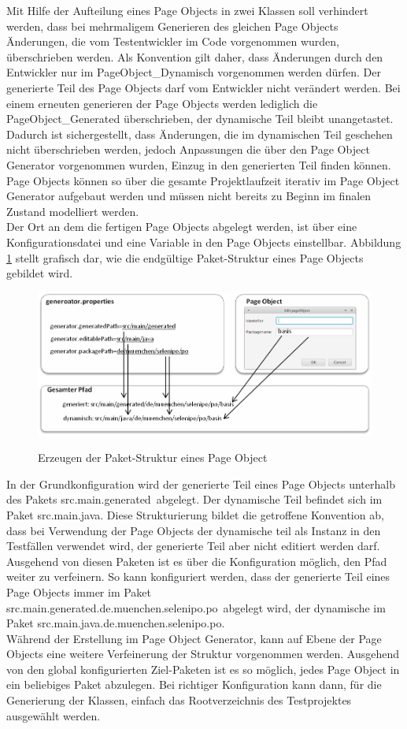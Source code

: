 Mit Hilfe der Aufteilung eines Page Objects in zwei Klassen soll verhindert werden, dass bei mehrmaligem Generieren des gleichen Page Objects Änderungen, die vom Testentwickler im Code vorgenommen wurden, überschrieben werden. Als Konvention gilt daher, dass Änderungen durch den Entwickler nur im PageObject\_Dynamisch vorgenommen werden dürfen. Der generierte Teil des Page Objects darf vom Entwickler nicht verändert werden.
Bei einem erneuten generieren der Page Objects werden lediglich die PageObject\_Generated überschrieben, der dynamische Teil bleibt unangetastet.
Dadurch ist sichergestellt, dass Änderungen, die im dynamischen Teil geschehen nicht überschrieben werden, jedoch Anpassungen die über den Page Object Generator vorgenommen wurden, Einzug in den generierten Teil finden können.
Page Objects können so über die gesamte Projektlaufzeit iterativ im Page Object Generator aufgebaut werden und müssen nicht bereits zu Beginn im finalen Zustand modelliert werden.\\
Der Ort an dem die fertigen Page Objects abgelegt werden, ist über eine Konfigurationsdatei und eine Variable in den Page Objects einstellbar. 
Abbildung \ref{fig:packagepath} stellt grafisch dar, wie die endgültige Paket-Struktur eines Page Objects gebildet wird.
\begin{figure}[htb]
  \centering  
  \includegraphics[scale=0.8]{img/packagePath.png}\\
  \caption{Erzeugen der Paket-Struktur eines Page Object}
  \label{fig:packagepath}
\end{figure}
In der Grundkonfiguration wird der generierte Teil eines Page Objects unterhalb des Pakets \grq src.main.generated\grq\ abgelegt. Der dynamische Teil befindet sich im Paket \grq src.main.java\grq.
Diese Strukturierung bildet die getroffene Konvention ab, dass bei Verwendung der Page Objects der dynamische teil als Instanz in den Testfällen verwendet wird, der generierte Teil aber nicht editiert werden darf.
Ausgehend von diesen Paketen ist es über die Konfiguration möglich, den Pfad weiter zu verfeinern. So kann konfiguriert werden, dass der generierte Teil eines Page Objects immer im Paket \grq src.main.generated.de.muenchen.selenipo.po\grq\ abgelegt wird, der dynamische im Paket \grq src.main.java.de.muenchen.selenipo.po\grq.\\
Während der Erstellung im Page Object Generator, kann auf Ebene der Page Objects eine weitere Verfeinerung der Struktur vorgenommen werden. Ausgehend von den global konfigurierten Ziel-Paketen ist es so möglich, jedes Page Object in ein beliebiges Paket abzulegen.
Bei richtiger Konfiguration kann dann, für die Generierung der Klassen, einfach das Rootverzeichnis des Testprojektes ausgewählt werden.

